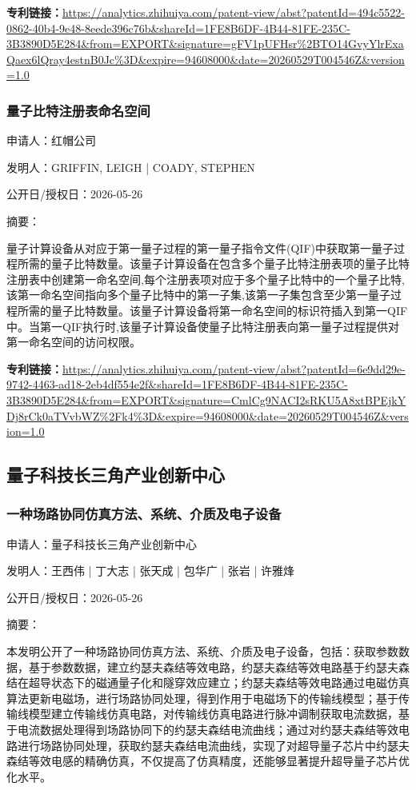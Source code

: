 \documentclass[12pt,a4paper]{ctexart}
\begin{document}
\noindent\textbf{专利链接：}\url{https://analytics.zhihuiya.com/patent-view/abst?patentId=494c5522-0862-40b4-9e48-8eede396c76b&shareId=1FE8B6DF-4B44-81FE-235C-3B3890D5E284&from=EXPORT&signature=gFV1pUFHsr%2BTO14GvyYlrExaQaex6lQray4estnB0Jc%3D&expire=94608000&date=20260529T004546Z&version=1.0}

\subsubsection{ 量子比特注册表命名空间 }

申请人：红帽公司

发明人：GRIFFIN, LEIGH | COADY, STEPHEN

公开日/授权日：2026-05-26

摘要：

量子计算设备从对应于第一量子过程的第一量子指令文件(QIF)中获取第一量子过程所需的量子比特数量。该量子计算设备在包含多个量子比特注册表项的量子比特注册表中创建第一命名空间,每个注册表项对应于多个量子比特中的一个量子比特,该第一命名空间指向多个量子比特中的第一子集,该第一子集包含至少第一量子过程所需的量子比特数量。该量子计算设备将第一命名空间的标识符插入到第一QIF中。当第一QIF执行时,该量子计算设备使量子比特注册表向第一量子过程提供对第一命名空间的访问权限。

\noindent\textbf{专利链接：}\url{https://analytics.zhihuiya.com/patent-view/abst?patentId=6e9dd29e-9742-4463-ad18-2eb4df554e2f&shareId=1FE8B6DF-4B44-81FE-235C-3B3890D5E284&from=EXPORT&signature=CmlCg9NACI2sRKU5A8xtBPEjkYDj8rCk0aTVvbWZ%2Fk4%3D&expire=94608000&date=20260529T004546Z&version=1.0}


\subsection{ 量子科技长三角产业创新中心 }

\subsubsection{ 一种场路协同仿真方法、系统、介质及电子设备 }

申请人：量子科技长三角产业创新中心

发明人：王西伟 | 丁大志 | 张天成 | 包华广 | 张岩 | 许雅烽

公开日/授权日：2026-05-26

摘要：

本发明公开了一种场路协同仿真方法、系统、介质及电子设备，包括：获取参数数据，基于参数数据，建立约瑟夫森结等效电路，约瑟夫森结等效电路基于约瑟夫森结在超导状态下的磁通量子化和隧穿效应建立；约瑟夫森结等效电路通过电磁仿真算法更新电磁场，进行场路协同处理，得到作用于电磁场下的传输线模型；基于传输线模型建立传输线仿真电路，对传输线仿真电路进行脉冲调制获取电流数据，基于电流数据处理得到场路协同下的约瑟夫森结电流曲线；通过对约瑟夫森结等效电路进行场路协同处理，获取约瑟夫森结电流曲线，实现了对超导量子芯片中约瑟夫森结等效电感的精确仿真，不仅提高了仿真精度，还能够显著提升超导量子芯片优化水平。
\end{document}
